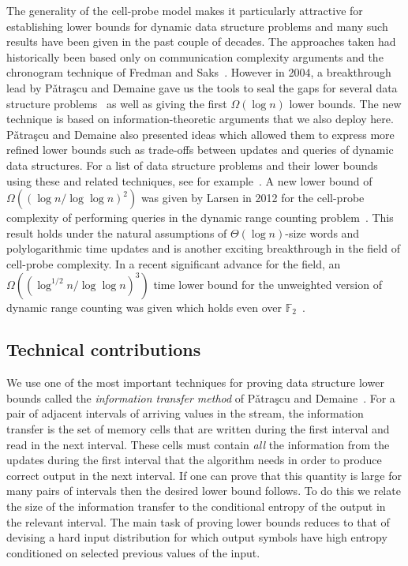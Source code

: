 \documentclass[11pt]{article}
\numberwithin{equation}{section}
\theoremstyle{definition}
\theoremstyle{plain}
\newcommand{\Patrascu}{P{\v a}tra{\c s}cu\xspace}
\begin{document}
The generality of the cell-probe model makes it particularly attractive for establishing lower bounds for dynamic data structure problems and many such results have been given in the past couple of decades. The approaches taken had historically been based only on communication complexity arguments and the chronogram technique of Fredman and Saks~\cite{FS1989:chronogram}.
%
However in 2004, a breakthrough lead by \Patrascu and Demaine gave us the tools to seal the gaps for several data structure problems~\cite{PD2006:Low-Bounds} as well as giving the first $\Omega(\log{n})$ lower bounds. The new technique is based on
%
information-theoretic   %
arguments that we also deploy here. \Patrascu and Demaine also presented ideas which allowed them to express more refined lower bounds such as trade-offs between updates and queries of dynamic data structures.  For a list of data structure problems and their lower bounds using these and related techniques, see for example~\cite{Pat2008:Thesis}.  A new lower bound of $\Omega\left((\log{n}/\log{\log{n}})^2\right)$ was given by Larsen in 2012 for the cell-probe complexity of performing queries in the dynamic range counting problem~\cite{Larsen:2012}.
This result  holds under the natural assumptions of
%
$\Theta(\log{n})$-size   %
words and polylogarithmic time updates and is another exciting breakthrough in the field of cell-probe complexity.  In a recent significant advance for the field, an $\Omega((\log^{1/2} n/\log{\log{n}})^3)$ time lower bound for the unweighted version of dynamic range counting was given which holds even over $\mathbb{F}_2$~\cite{larsen:2017:crossing}.




%
\subsection{Technical contributions}

We use one of the most important techniques for proving data structure lower bounds called the \emph{information transfer method} of \Patrascu and Demaine~\cite{PD2004:Partial-sums,PD2006:Low-Bounds}.
For a pair of adjacent intervals of arriving values in the stream, the information transfer is the set
of memory cells that are written during the first interval and read in
the next interval. These cells must contain \emph{all} the
information from
the updates during the first interval that the algorithm needs in order 
to produce correct
%
%
output  %
in the next interval. If
one can prove that this quantity is large for many pairs of intervals
then the desired lower
%
bound follows.   %
To do this we relate the size
of the information transfer to the conditional entropy of the
%
output  %
in the relevant interval. The main task of proving lower bounds
reduces to that of devising a hard input distribution for which output symbols
have high entropy conditioned on selected previous values of the input.
\end{document}
